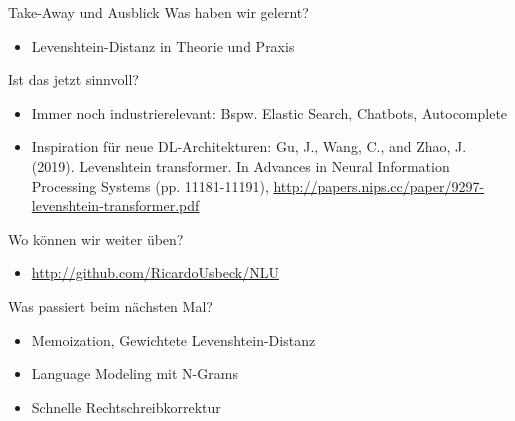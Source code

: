 \documentclass[aspectratio=169]{beamer}
\begin{document}
\begin{frame}{Take-Away und Ausblick} 
Was haben wir gelernt?
\begin{itemize}
    \item Levenshtein-Distanz in Theorie und Praxis
\end{itemize}
Ist das jetzt sinnvoll?
\begin{itemize}
    \item Immer noch industrierelevant: Bspw. Elastic Search, Chatbots, Autocomplete
    \item Inspiration für neue DL-Architekturen: Gu, J., Wang, C., and Zhao, J. (2019). Levenshtein transformer. In Advances in Neural Information Processing Systems (pp. 11181-11191), \url{http://papers.nips.cc/paper/9297-levenshtein-transformer.pdf}
\end{itemize}
Wo können wir weiter üben?
\begin{itemize}
    \item \url{http://github.com/RicardoUsbeck/NLU}
\end{itemize}
Was passiert beim nächsten Mal?
\begin{itemize}
    \item Memoization, Gewichtete Levenshtein-Distanz
    \item Language Modeling mit N-Grams
    \item Schnelle Rechtschreibkorrektur
\end{itemize}
\end{frame}
\end{document}

